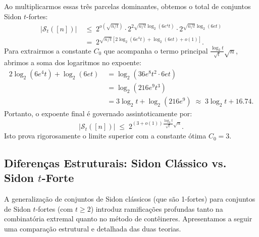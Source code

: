 \documentclass[reqno,a4paper,12pt]{amsart}
\begin{document}
Ao multiplicarmos essas três parcelas dominantes, obtemos o total de conjuntos Sidon $t$-fortes:
\begin{align*}
  |\mathcal{S}_t([n])| \; & \le\; 2^{o(\sqrt{n/t})} \cdot 2^{2\sqrt{n/t}\log_2(6e^4 t)} \cdot 2^{\sqrt{n/t}\log_2(6e t)} \\
                          & =\; 2^{\sqrt{n/t} \left[ 2\log_2(6e^4 t) + \log_2(6e t) + o(1) \right]}.
\end{align*}
Para extrairmos a constante $C_0$ que acompanha o termo principal $\frac{\log_2 t}{\sqrt{t}}\sqrt{n}$, abrimos a soma dos logaritmos no expoente:
\begin{align*}
  2\log_2(6e^4 t) + \log_2(6e t) \; & = \log_2\left( 36 e^8 t^2 \cdot 6 e t \right)                \\
                                    & = \log_2\left( 216 e^9 t^3 \right)                           \\
                                    & = 3\log_2 t + \log_2(216 e^9) \;\approx\; 3\log_2 t + 16.74.
\end{align*}
Portanto, o expoente final é governado assintoticamente por:
\[
  |\mathcal{S}_t([n])| \;\le\; 2^{(3+o(1)) \frac{\log_2 t}{\sqrt{t}}\sqrt{n}}.
\]
Isto prova rigorosamente o limite superior com a constante ótima $C_0 = 3$.

\subsection{Diferenças Estruturais: Sidon Clássico vs. Sidon $t$-Forte}
\label{subsec:diferencas}

A generalização de conjuntos de Sidon clássicos (que são 1-fortes) para conjuntos de Sidon $t$-fortes (com $t \ge 2$) introduz ramificações profundas tanto na combinatória extremal quanto no método de contêineres. Apresentamos a seguir uma comparação estrutural e detalhada das duas teorias.
\end{document}
